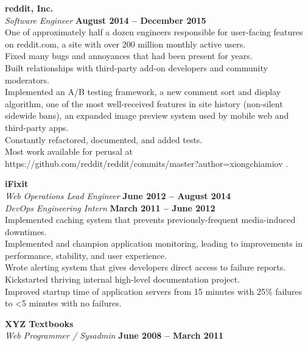 \documentclass[margin,line]{resume}
\begin{document}
\begin{resume}
    \textbf{\listing reddit, Inc.} \vspace{2mm}\\\vspace{1mm}%
    \textsl{Software Engineer} \hfill \textbf{August 2014 -- December 2015}\\
    One of approximately half a dozen engineers responsible for user-facing features on reddit.com, a site with over 200 million monthly active users.\\
    Fixed many bugs and annoyances that had been present for years.\\
    Built relationships with third-party add-on developers and community moderators.\\
    Implemented an A/B testing framework, a new comment sort and display algorithm, one of the most well-received features in site history (non-silent sidewide bans), an expanded image preview system used by mobile web and third-party apps.\\
    Constantly refactored, documented, and added tests.\\
    Most work available for perusal at https://github.com/reddit/reddit/commits/master?author=xiongchiamiov .

    \textbf{\listing iFixit} \vspace{2mm}\\\vspace{1mm}%
    \textsl{Web Operations Lead Engineer} \hfill \textbf{June 2012 -- August 2014}\\
    \textsl{DevOps Engineering Intern} \hfill \textbf{March 2011 -- June 2012}\\
    Implemented caching system that prevents previously-frequent media-induced downtimes.\\
    Implemented and champion application monitoring, leading to improvements in performance, stability, and user experience.\\
    Wrote alerting system that gives developers direct access to failure reports.\\
    Kickstarted thriving internal high-level documentation project.\\
    Improved startup time of application servers from 15 minutes with 25\% failures to \textless5 minutes with no failures.

    \textbf{\listing XYZ Textbooks} \vspace{2mm}\\\vspace{1mm}%
    \textsl{Web Programmer / Sysadmin} \hfill \textbf{June 2008 -- March 2011}


\end{resume}
\end{document}
